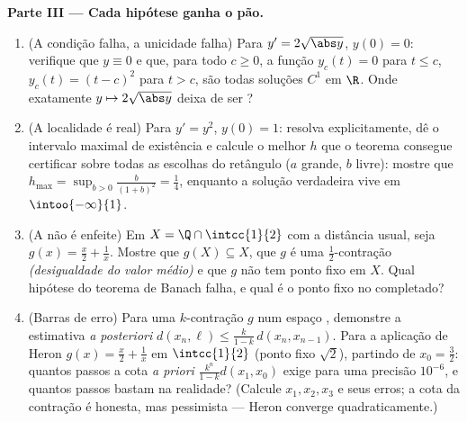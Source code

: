 \begin{problem}
\medskip
\noindent\textbf{Parte III --- Cada hipótese ganha o pão.}
\begin{enumerate}[resume]
  \item (A condição  falha, a unicidade falha) Para $y' =
        2\sqrt{\abs y}$, $y(0) = 0$: verifique que $y \equiv 0$
        e que, para todo $c \geq 0$, a função $y_c(t) = 0$ para
        $t \leq c$, $y_c(t) = (t - c)^2$ para $t > c$, são todas
        soluções $C^1$ em $\R$. Onde exatamente $y \mapsto
        2\sqrt{\abs y}$ deixa de ser ?
  \item (A localidade é real) Para $y' = y^2$, $y(0) = 1$: resolva
        explicitamente, dê o intervalo maximal de existência e
        calcule o melhor $h$ que o teorema consegue certificar sobre todas as
        escolhas do retângulo ($a$ grande, $b$ livre): mostre que
        $h_{\max} = \sup_{b>0} \frac{b}{(1+b)^2} = \frac14$,
        enquanto a solução verdadeira vive em $\intoo{-\infty}{1}$.
  \item (A  não é enfeite) Em $X = \Q \cap
        \intcc{1}{2}$ com a distância usual, seja $g(x) =
        \frac x2 + \frac1x$. Mostre que $g(X) \subseteq X$, que $g$
        é uma $\frac12$-contração \emph{(desigualdade do valor
        médio)} e que $g$ não tem ponto fixo em $X$.
        Qual hipótese do teorema de Banach falha, e qual é
        o ponto fixo no completado?
  \item (Barras de erro) Para uma $k$-contração $g$ num espaço
        , demonstre a estimativa \emph{a posteriori} $d(x_n,
        \ell) \leq \frac{k}{1-k}\,d(x_n, x_{n-1})$. Para a
        aplicação de Heron $g(x) = \frac x2 + \frac 1x$ em $\intcc{1}{2}$
        (ponto fixo $\sqrt2$), partindo de $x_0 = \frac32$:
        quantos passos a cota \emph{a priori}
        $\frac{k^n}{1-k}d(x_1, x_0)$ exige para uma precisão
        $10^{-6}$, e quantos passos bastam na realidade?
        (Calcule $x_1, x_2, x_3$ e seus erros; a cota da
        contração é honesta, mas pessimista ---
        Heron converge quadraticamente.)
\end{enumerate}


\end{problem}
